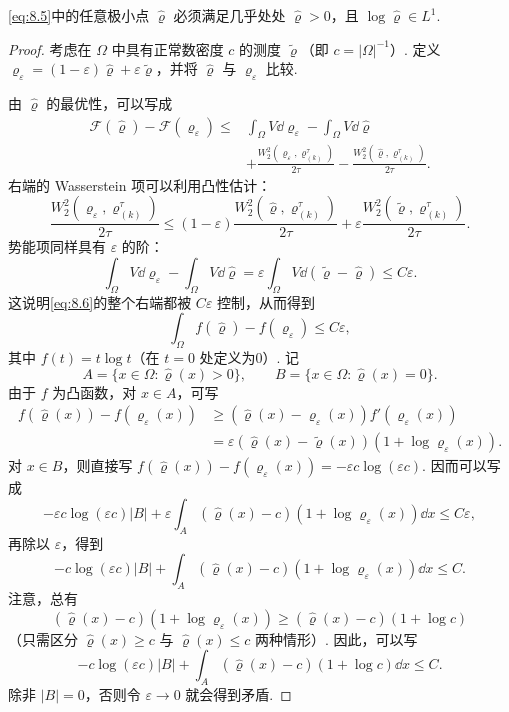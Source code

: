 \begin{lemma}\label{obj:8.6}
\eqref{eq:8.5}中的任意极小点 $\widehat\varrho$ 必须满足几乎处处 $\widehat\varrho>0$，且 $\log\widehat\varrho\in L^1$.
\end{lemma}
\begin{proof}
考虑在 $\Omega$ 中具有正常数密度 $c$ 的测度 $\widetilde\varrho$（即 $c=|\Omega|^{-1}$）. 定义 $\varrho_\varepsilon=(1-\varepsilon)\widehat\varrho+\varepsilon\widetilde\varrho$，并将 $\widehat\varrho$ 与 $\varrho_\varepsilon$ 比较.

由 $\widehat\varrho$ 的最优性，可以写成
\begin{equation}\label{eq:8.6}
\begin{aligned}
\mathscr F(\widehat\varrho)-\mathscr F(\varrho_\varepsilon)
\leq{}&\int_\Omega V\dd\varrho_\varepsilon-\int_\Omega V\dd\widehat\varrho\\
&+\frac{W_2^2(\varrho_\varepsilon,\varrho_{(k)}^\tau)}{2\tau}
-\frac{W_2^2(\widehat\varrho,\varrho_{(k)}^\tau)}{2\tau}.
\end{aligned}
\end{equation}
右端的 Wasserstein 项可以利用凸性估计：
\[
\frac{W_2^2(\varrho_\varepsilon,\varrho_{(k)}^\tau)}{2\tau}
\leq(1-\varepsilon)\frac{W_2^2(\widehat\varrho,\varrho_{(k)}^\tau)}{2\tau}
+\varepsilon\frac{W_2^2(\widetilde\varrho,\varrho_{(k)}^\tau)}{2\tau}.
\]
势能项同样具有 $\varepsilon$ 的阶：
\[
\int_\Omega V\dd\varrho_\varepsilon-\int_\Omega V\dd\widehat\varrho
=\varepsilon\int_\Omega V\dd(\widetilde\varrho-\widehat\varrho)\leq C\varepsilon.
\]
这说明\eqref{eq:8.6}的整个右端都被 $C\varepsilon$ 控制，从而得到
\[
\int_\Omega f(\widehat\varrho)-f(\varrho_\varepsilon)\leq C\varepsilon,
\]
其中 $f(t)=t\log t$（在 $t=0$ 处定义为0）. 记
\[
A=\{x\in\Omega:\widehat\varrho(x)>0\},\qquad
B=\{x\in\Omega:\widehat\varrho(x)=0\}.
\]
由于 $f$ 为凸函数，对 $x\in A$，可写
\[
\begin{aligned}
f(\widehat\varrho(x))-f(\varrho_\varepsilon(x))
&\geq(\widehat\varrho(x)-\varrho_\varepsilon(x))f'(\varrho_\varepsilon(x))\\
&=\varepsilon(\widehat\varrho(x)-\widetilde\varrho(x))(1+\log\varrho_\varepsilon(x)).
\end{aligned}
\]
对 $x\in B$，则直接写 $f(\widehat\varrho(x))-f(\varrho_\varepsilon(x))=-\varepsilon c\log(\varepsilon c)$. 因而可以写成
\[
-\varepsilon c\log(\varepsilon c)|B|
+\varepsilon\int_A(\widehat\varrho(x)-c)(1+\log\varrho_\varepsilon(x))\dd x\leq C\varepsilon,
\]
再除以 $\varepsilon$，得到
\begin{equation}\label{eq:8.7}
-c\log(\varepsilon c)|B|+\int_A(\widehat\varrho(x)-c)(1+\log\varrho_\varepsilon(x))\dd x\leq C.
\end{equation}
注意，总有
\[
(\widehat\varrho(x)-c)(1+\log\varrho_\varepsilon(x))
\geq(\widehat\varrho(x)-c)(1+\log c)
\]
（只需区分 $\widehat\varrho(x)\geq c$ 与 $\widehat\varrho(x)\leq c$ 两种情形）. 因此，可以写
\[
-c\log(\varepsilon c)|B|+\int_A(\widehat\varrho(x)-c)(1+\log c)\dd x\leq C.
\]
除非 $|B|=0$，否则令 $\varepsilon\to0$ 就会得到矛盾.


\end{proof}
